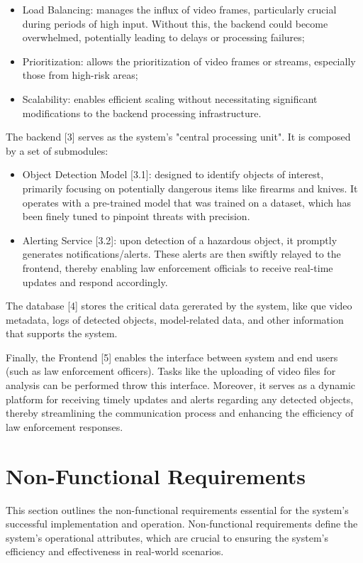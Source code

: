 \begin{itemize}
    \item Load Balancing: manages the influx of video frames, particularly crucial during periods of high input. Without this, the backend could become overwhelmed, potentially leading to delays or processing failures;
    \item Prioritization: allows the prioritization of video frames or streams, especially those from high-risk areas;
    \item Scalability: enables efficient scaling without necessitating significant modifications to the backend processing infrastructure.
\end{itemize}

The backend [3] serves as the system's "central processing unit". It is composed by a set of submodules:
\begin{itemize}
    \item Object Detection Model [3.1]: designed to identify objects of interest, primarily focusing on potentially dangerous items like firearms and knives. It operates with a pre-trained model that was trained on a dataset, which has been finely tuned to pinpoint threats with precision.
    \item Alerting Service [3.2]: upon detection of a hazardous object, it promptly generates notifications/alerts. These alerts are then swiftly relayed to the frontend, thereby enabling law enforcement officials to receive real-time updates and respond accordingly.
\end{itemize}

The database [4] stores the critical data gererated by the system, like que video metadata, logs of detected objects, 
model-related data, and other information that supports the system.

Finally, the Frontend [5] enables the interface between system and end users (such as law enforcement officers). Tasks like the uploading of video files for analysis can be performed throw  this interface. Moreover, it serves as a dynamic platform for receiving timely updates and alerts regarding any detected objects, thereby streamlining the communication process and enhancing the efficiency of law enforcement responses.

\section{Non-Functional Requirements}
This section outlines the non-functional requirements essential for the system's successful implementation and operation.
Non-functional requirements define the system's operational attributes, which are crucial to ensuring the system's 
efficiency and effectiveness in real-world scenarios. 

